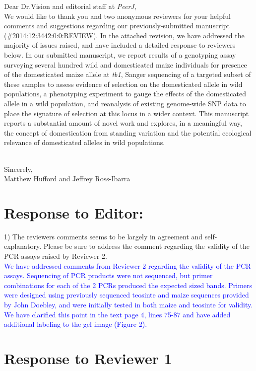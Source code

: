 \documentclass[11pt]{article}
\newcommand{\res}[1]{\noindent \textcolor{blue}{{#1}} \\}
\begin{document}
\noindent Dear Dr.Vision and editorial staff at \emph{PeerJ}, \\

We would like to thank you and two anonymous reviewers for your helpful comments and suggestions regarding our previously-submitted manuscript (\#2014:12:3442:0:0:REVIEW).  In the attached revision, we have addressed the majority of issues raised, and have included a detailed response to reviewers below.  In our submitted manuscript, we report results of a genotyping assay surveying several hundred wild and domesticated maize individuals for presence of the domesticated maize allele at \emph{tb1}, Sanger sequencing of a targeted subset of these samples to assess evidence of selection on the domesticated allele in wild populations, a phenotyping experiment to gauge the effects of the domesticated allele in a wild population, and reanalysis of existing genome-wide SNP data to place the signature of selection at this locus in a wider context.  This manuscript reports a substantial amount of novel work and explores, in a meaningful way, the concept of domestication from standing variation and the potential ecological relevance of domesticated alleles in wild populations.\\\

\noindent Sincerely,\\

\noindent Matthew Hufford and Jeffrey Ross-Ibarra

\section*{Response to Editor:}

1) The reviewers comments seems to be largely in agreement and self-explanatory. Please be sure to address the comment regarding the validity of the PCR assays raised by Reviewer 2.\\

\res{We have addressed comments from Reviewer 2 regarding the validity of the PCR assays. Sequencing of PCR products were not sequenced, but primer combinations for each of the 2 PCRs produced the expected sized bands. Primers were designed using previously sequenced teosinte and maize sequences provided by John Doebley, and were initially tested in both maize and teosinte for validity.  We have clarified this point in the text page 4, lines 75-87 and have added additional labeling to the gel image (Figure 2).} 

\section*{Response to Reviewer 1}
\end{document}
